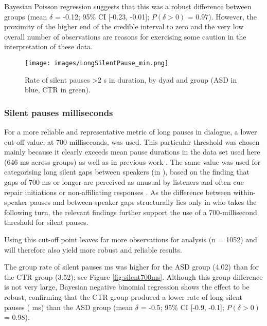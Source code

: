 Bayesian Poisson regression suggests that this was a robust difference between groups (mean \(\delta\) = -0.12; 95\% CI {[}-0.23, -0.01{]}; \(P(\delta > 0)\) = 0.97). However, the proximity of the higher end of the credible interval to zero and the very low overall number of observations are reasons for exercising some caution in the interpretation of these data.

\begin{figure}

\texttt{[image: images/LongSilentPause\_min.png]} \hfill{}

\caption{Rate of silent pauses >2 s in duration, by dyad and group (ASD in blue, CTR in green).}\label{fig:silent2s}
\end{figure}


\subsubsection{\texorpdfstring{Silent pauses  milliseconds}{over 700 secs}}\label{BCFP_FP_silent_results_700}

For a more reliable and representative metric of long pauses in dialogue, a lower cut-off value, at 700 milliseconds, was used. This particular threshold was chosen mainly because it clearly exceeds mean pause durations in the data set used here (646 ms across groups) as well as in previous work \citep{dejongChoosingThresholdSilent2013,choContributionSilentPauses2006,megyesiProductionPerceptionPauses2002}. The same value was used for categorising long silent gaps between
speakers (in ), based on the finding that gaps of 700 ms or longer are perceived as unusual by listeners and often cue repair initiations or non-affiliating responses \citep{kendrickIntersectionTurntakingRepair2015,kendrickTimingConstructionPreference2015a,robertsIdentifyingTemporalThreshold2013}. As the difference between within-speaker pauses and between-speaker gaps structurally lies only in who takes the following turn, the relevant findings further support the use of a 700-millisecond threshold for silent pauses.

Using this cut-off point leaves far more observations for analysis (n = 1052) and will therefore also yield more robust and reliable results. 

The group rate of silent pauses  ms was higher for the ASD group (4.02) than for the CTR group (3.52); see Figure \ref{fig:silent700ms}. Although this group difference is not very large, Bayesian negative binomial regression shows the effect to be robust, confirming that the CTR group produced a lower rate of long silent pauses ( ms) than the ASD group (mean \(\delta\) = -0.5; 95\% CI {[}-0.9, -0.1{]}; \(P(\delta > 0)\) = 0.98).

